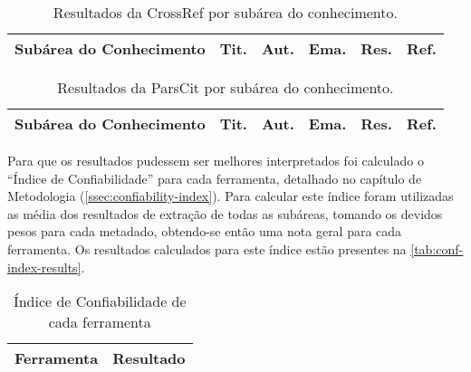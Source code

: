 \begin{table}
    \caption{Resultados da CrossRef por subárea do conhecimento.}
    \begin{center}
        \begin{tabular}{|p{6cm}|C{1.2cm}|C{1.2cm}|C{1.2cm}|C{1.2cm}|C{1.2cm}|}
            \hline 
            \textbf{Subárea do Conhecimento} & \textbf{Tit.} & \textbf{Aut.} & \textbf{Ema.} & \textbf{Res.} & \textbf{Ref.} \\ \hline 
            
        \end{tabular}
    \end{center}
    \label{tab:results-crossref}
\end{table}

\begin{table}
    \caption{Resultados da ParsCit por subárea do conhecimento.}
    \begin{center}
        \begin{tabular}{|p{6cm}|C{1.2cm}|C{1.2cm}|C{1.2cm}|C{1.2cm}|C{1.2cm}|}
            \hline 
            \textbf{Subárea do Conhecimento} & \textbf{Tit.} & \textbf{Aut.} & \textbf{Ema.} & \textbf{Res.} & \textbf{Ref.} \\ \hline 
            
        \end{tabular}
    \end{center}
    \label{tab:results-parscit}
\end{table}


Para que os resultados pudessem ser melhores interpretados foi calculado o ``Índice de Confiabilidade'' para cada ferramenta, detalhado no capítulo de Metodologia (\autoref{ssec:confiability-index}). Para calcular este índice foram utilizadas as média dos resultados de extração de todas as subáreas, tomando os devidos pesos para cada metadado, obtendo-se então uma nota geral para cada ferramenta. Os resultados calculados para este índice estão presentes na \autoref{tab:conf-index-results}.

\begin{table}
    \caption{Índice de Confiabilidade de cada ferramenta}
    \begin{center}
        \begin{tabular}{|p{3cm}|C{3cm}|}
            \hline 
            \textbf{Ferramenta} & \textbf{Resultado} \\ \hline 
            
        \end{tabular}
    \end{center}
    \label{tab:conf-index-results}
\end{table}

